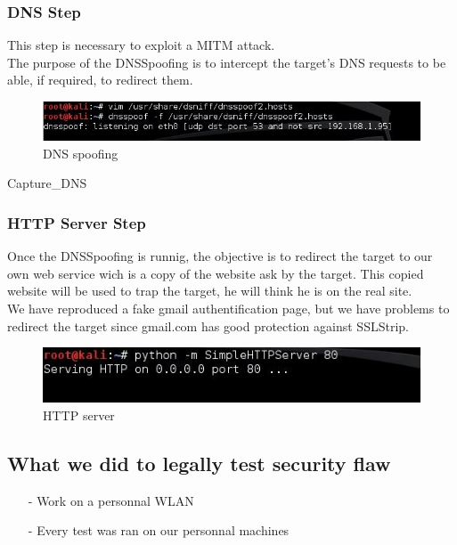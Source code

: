 \documentclass[a4paper, 11pt, oneside]{article}
\begin{document}
\subsubsection{DNS Step}
This step is necessary to exploit a MITM attack.\\
The purpose of the DNSSpoofing is to intercept the target's DNS requests to be able, if required, to redirect them.\\
\begin{figure}[!h]
	\centering
	\includegraphics[scale=0.80]{../images/dnsSpoof.jpg}
	\caption{DNS spoofing}
	\label{DNS_spoofing}
\end{figure}
Capture_DNS 

\subsubsection{HTTP Server Step}
Once the DNSSpoofing is runnig, the objective is to redirect the target to our own web service wich is a copy of the website ask by the target.
This copied website will be used to trap the target, he will think he is on the real site.\\
We have reproduced a fake gmail authentification page, but we have problems to redirect the target since gmail.com has good protection against SSLStrip.
\begin{figure}[!h]
	\centering
	\includegraphics[scale=0.80]{../images/serverHTTP.jpg}
	\caption{HTTP server}
	\label{serverHTTP}
\end{figure}

\subsection{What we did to legally test security flaw}
\begin{itemize}
    \item[-] Work on a personnal WLAN\\
    \item[-] Every test was ran on our personnal machines\\
\end{itemize}
\end{document}
